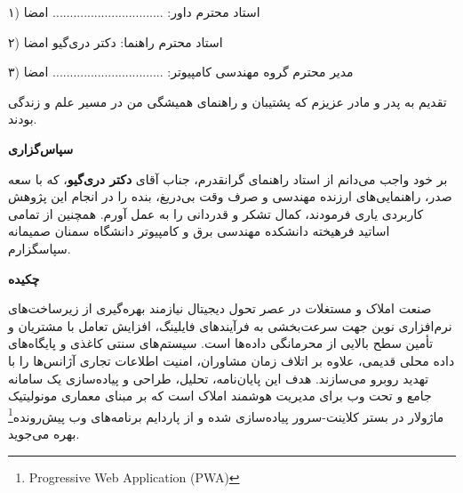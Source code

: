 \documentclass[11pt, a4paper]{report}
\newcommand{\enfootnote}[1]{\footnote{\foreignlanguage{english}{#1}}}
\begin{document}
\noindent ۱) استاد محترم داور: ................................ \hfill امضا \par
\vspace{0.8cm}
\noindent ۲) استاد محترم راهنما: دکتر دری‌گیو \hfill امضا \par
\vspace{0.8cm}
\noindent ۳) مدیر محترم گروه مهندسی کامپیوتر: ................................ \hfill امضا \par

\clearpage
\thispagestyle{empty}
\vspace*{7cm}
\begin{center}
    {\Large تقدیم به پدر و مادر عزیزم که پشتیبان و راهنمای همیشگی من در مسیر علم و زندگی بودند.}
\end{center}

\clearpage
\thispagestyle{empty}
\vspace*{2.5cm}
\begin{center}
    {\Large \bfseries سپاس‌گزاری}
\end{center}
\vspace{1cm}
بر خود واجب می‌دانم از استاد راهنمای گرانقدرم، جناب آقای \textbf{دکتر دری‌گیو}، که با سعه صدر، راهنمایی‌های ارزنده مهندسی و صرف وقت بی‌دریغ، بنده را در انجام این پژوهش کاربردی یاری فرمودند، کمال تشکر و قدردانی را به عمل آورم. همچنین از تمامی اساتید فرهیخته دانشکده مهندسی برق و کامپیوتر دانشگاه سمنان صمیمانه سپاسگزارم.

\clearpage
{}
\setcounter{page}{1}
\begin{center}
    {\Large \bfseries چکیده}
\end{center}
\vspace{0.5cm}
صنعت املاک و مستغلات در عصر تحول دیجیتال نیازمند بهره‌گیری از زیرساخت‌های نرم‌افزاری نوین جهت سرعت‌بخشی به فرآیندهای فایلینگ، افزایش تعامل با مشتریان و تأمین سطح بالایی از محرمانگی داده‌ها است. سیستم‌های سنتی کاغذی و پایگاه‌های داده محلی قدیمی، علاوه بر اتلاف زمان مشاوران، امنیت اطلاعات تجاری آژانس‌ها را با تهدید روبرو می‌سازند. هدف این پایان‌نامه، تحلیل، طراحی و پیاده‌سازی یک سامانه جامع و تحت وب برای مدیریت هوشمند املاک است که بر مبنای معماری مونولیتیک ماژولار در بستر کلاینت-سرور پیاده‌سازی شده و از پاردایم برنامه‌های وب پیش‌رونده\enfootnote{Progressive Web Application (PWA)} بهره می‌جوید.
\end{document}

